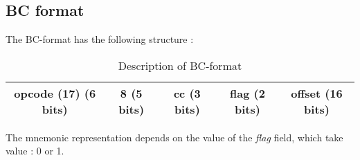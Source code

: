\subsection*{BC format}

	The BC-format has the following structure :
	\begin{table}[H]
		\centering
		\begin{tabular}{|c|c|c|c|c|}
		\hline 
		opcode (17) (6 bits) & 8 (5 bits) & cc (3 bits) & flag (2 bits) & offset (16 bits) \\ 
		\hline 
		\end{tabular} 
		\caption{Description of BC-format}
	\end{table}
	
	The mnemonic representation depends on the value of the \textit{flag} field, which take value : 0 or 1.